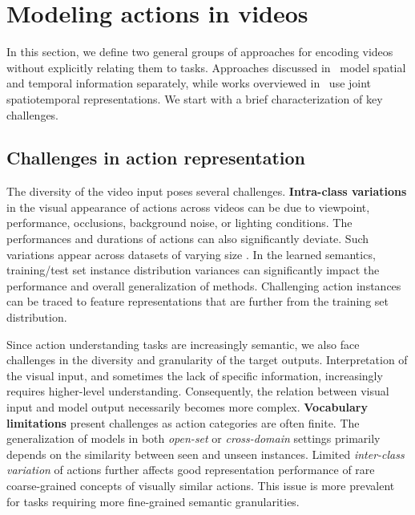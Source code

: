 \section{Modeling actions in videos}
\label{sec:modeling}

In this section, we define two general groups of approaches for encoding videos without explicitly relating them to tasks. Approaches discussed in~ model spatial and temporal information separately, while works overviewed in~ use joint spatiotemporal representations. We start with a brief characterization of key challenges.

\subsection{Challenges in action representation}
\label{sec:modeling::challenges}
The diversity of the video input poses several challenges. \textbf{Intra-class variations} in the visual appearance of actions across videos can be due to viewpoint, performance, occlusions, background noise, or lighting conditions. The performances and durations of actions can also significantly deviate. Such variations appear across datasets of varying size \citep{grauman2022ego4d,kay2017kinetics,miech2019howto100m,soomro2012ucf101}. In the learned semantics, training/test set instance distribution variances can significantly impact the performance and overall generalization of methods. Challenging action instances can be traced to feature representations that are further from the training set distribution.

Since action understanding tasks are increasingly semantic, we also face challenges in the diversity and granularity of the target outputs. Interpretation of the visual input, and sometimes the lack of specific information, increasingly requires higher-level understanding. Consequently, the relation between visual input and model output necessarily becomes more complex. \textbf{Vocabulary limitations} present challenges as action categories are often finite. The generalization of models in both \emph{open-set} or \emph{cross-domain} settings primarily depends on the similarity between seen and unseen instances. Limited \textit{inter-class variation} of actions further affects good representation performance of rare coarse-grained concepts of visually similar actions. This issue is more prevalent for tasks requiring more fine-grained semantic granularities.


